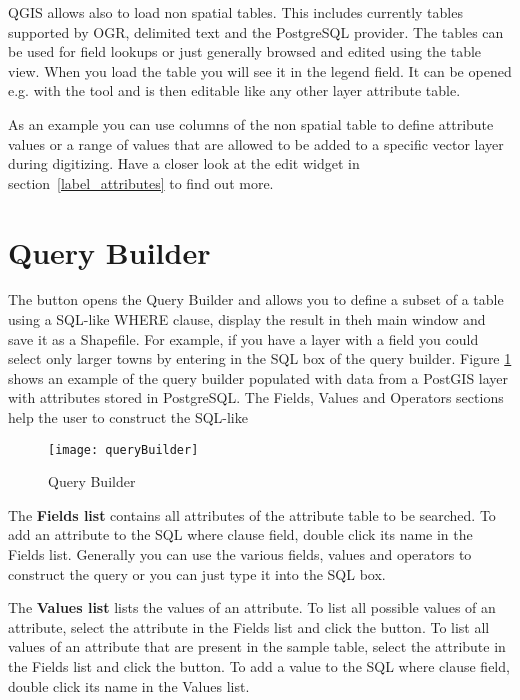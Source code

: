 
QGIS allows also to load non spatial tables. This includes currently tables 
supported by OGR, delimited text and the PostgreSQL provider. The tables can be 
used for field lookups or just generally browsed and edited using the table view. 
When you load the table you will see it in the legend field. It can be opened 
e.g. with the  tool and 
is then editable like any other layer attribute table. 

As an example you can use columns of the non spatial table to define attribute values or 
a range of values that are allowed to be added to a specific vector layer during digitizing. 
Have a closer look at the edit widget in section~\ref{label_attributes} to find out more.

\section{Query Builder}\label{sec:query_builder}

The  button opens the Query Builder and allows you to
define a subset of a table using a SQL-like WHERE clause, display the result in theh
main window and save it as a Shapefile. For example, if you have a
 layer
with a  field you could select only larger towns by entering
 in the SQL box of the query builder. Figure
\ref{fig:query_builder} shows an example of the query builder populated with
data from a PostGIS layer with attributes stored in PostgreSQL.
The Fields, Values and Operators sections help the user to construct the SQL-like

\begin{figure}[ht]
  \centering
    \texttt{[image: queryBuilder]}
    \caption{Query Builder \nixcaption}\label{fig:query_builder}
\end{figure}

The \textbf{Fields list} contains all attributes of the attribute table to be
searched. To add an attribute to the SQL where clause field, double click its
name in the Fields list. Generally you can use the various fields, values and
operators to construct the query or you can just type it into the SQL box.

The \textbf{Values list} lists the values of an attribute. To list all possible
values of an attribute, select the attribute in the Fields list and click the
 button. To list all values
of an attribute that are present in the sample table, select the attribute in
the Fields list and click the 
button. To add a value to the SQL
where clause field, double click its name in the Values list.

